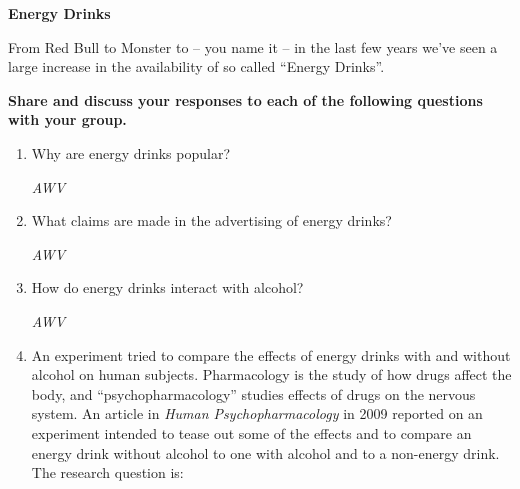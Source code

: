 \def\theTopic{Energy Drinks }
\def\dayNum{14}

\begin{center}
{\bf {\large Energy Drinks}}
\end{center}
\vspace{-.1in}

From Red Bull to Monster to -- you name it -- in the last few years
we've seen a large increase in the availability of so called ``Energy
Drinks''. 

{\bf Share and discuss your responses to each of the following
  questions with your group. }
\begin{enumerate}
  \item  Why are energy drinks popular? 
\begin{students}
    \vspace{4cm}    
\end{students}

\begin{key}
  {\it  AWV}
\end{key}

  \item  What claims are made in the advertising of energy drinks?
\begin{students}
     \vspace{5cm}    
\end{students}

\begin{key}
  {\it  AWV }
\end{key}

  \item  How do energy drinks interact with alcohol?
\begin{students}
    \vspace{5cm}    
\end{students}

\begin{key}
  {\it  AWV}
\end{key}

\item An experiment tried to compare the effects of energy drinks with
  and without alcohol on human subjects.  Pharmacology is the study of
  how drugs affect the body, and ``psychopharmacology'' studies
  effects of drugs on the nervous system. An article in {\it Human
    Psychopharmacology} in 2009 reported on an experiment intended to
  tease out some of the effects and to compare an energy drink without
  alcohol to one with alcohol and to a non-energy drink.  The research
  question is:


\end{enumerate}
